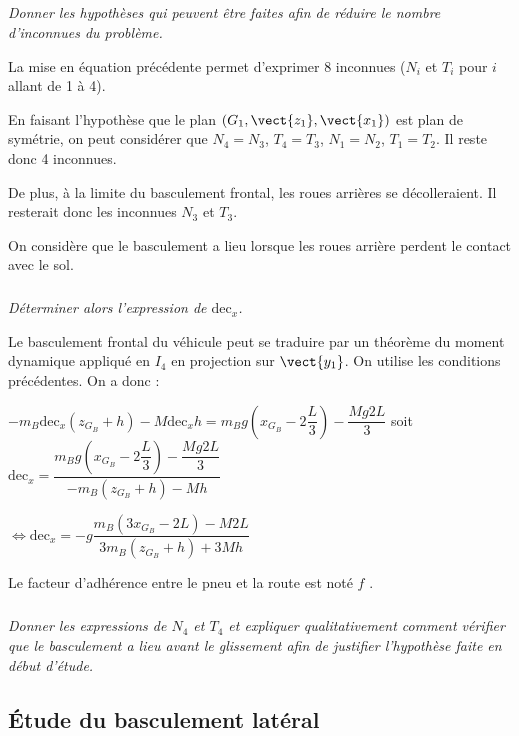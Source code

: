 \begin{multicols}{2}
\begin{corrige}
\end{corrige}
\else
\fi

\subparagraph{}
\textit{Donner les hypothèses qui peuvent être faites afin de réduire le nombre d’inconnues du
problème.}
\ifprof
\begin{corrige}
La mise en équation précédente permet d'exprimer 8 inconnues ($N_i$ et $T_i$ pour $i$ allant de 1 à 4).

En faisant l'hypothèse que le plan $\left(G_1,\vect{z_1},\vect{x_1}\right)$ est plan de symétrie, on peut considérer que $N_4=N_3$, $T_4=T_3$, $N_1=N_2$, $T_1=T_2$. Il reste donc 4 inconnues. 

De plus, à la limite du basculement frontal, les roues arrières se décolleraient. Il resterait donc les inconnues $N_3$ et $T_3$. 
\end{corrige}
\else
\fi

On considère que le basculement a lieu lorsque les roues arrière perdent le contact avec le sol.

\subparagraph{}
\textit{Déterminer alors l’expression de $\text{dec}_x$.}
\ifprof
\begin{corrige}
Le basculement frontal du véhicule peut se traduire par un théorème du moment dynamique appliqué en $I_4$ en projection sur $\vect{y_1}$. On utilise les conditions précédentes. On a donc : 
 
 $-m_B \text{dec}_x \left(z_{G_B}+h\right)-M\text{dec}_x h=m_B g\left(x_{G_B}-2\dfrac{L}{3}\right)-\dfrac{M g2L}{3}$ soit 
 $\text{dec}_x  = \dfrac{m_B g\left(x_{G_B}-2\dfrac{L}{3}\right)-\dfrac{M g2L}{3}}{-m_B  \left(z_{G_B}+h\right)-M h}$
 
 $ \Leftrightarrow \text{dec}_x  = -g\dfrac{m_B \left(3x_{G_B}-2L\right)-M 2L}{3m_B  \left(z_{G_B}+h\right)+3M h}$
\end{corrige}
\else
\fi

Le facteur d’adhérence entre le pneu et la route est noté $f$ .

\subparagraph{}
\textit{Donner les expressions de $N_4$ et $T_4$ et expliquer qualitativement comment vérifier que le
basculement a lieu avant le glissement afin de justifier l’hypothèse faite en début d’étude.}
\ifprof
\begin{corrige}
\end{corrige}
\else
\fi


\subsection*{Étude du basculement latéral}


\end{multicols}
